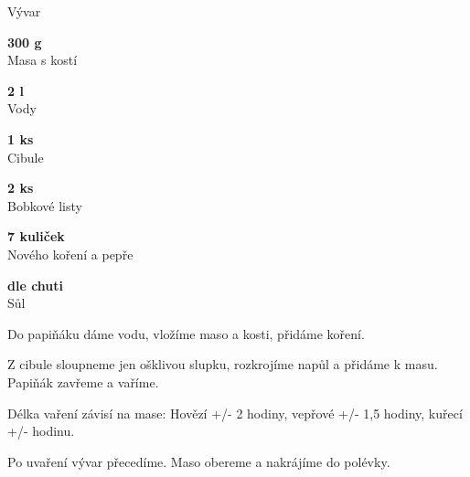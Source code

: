 \documentclass[11pt,a4paper]{article}
\begin{document}
\begin{recipe}[RawSienna]{Vývar}
    \begin{ingredients}
        \item \parbox[t]{\linewidth}{\raggedright \weight \textbf{300 g}\\ Masa s kostí}
        \item \parbox[t]{\linewidth}{\raggedright \liquid \textbf{2 l}\\ Vody}
        \item \parbox[t]{\linewidth}{\raggedright \piece \textbf{1 ks}\\ Cibule}
        \item \parbox[t]{\linewidth}{\raggedright \piece \textbf{2 ks}\\ Bobkové listy}
        \item \parbox[t]{\linewidth}{\raggedright \piece \textbf{7 kuliček}\\ Nového koření a pepře}
        \item \parbox[t]{\linewidth}{\raggedright \indefinite \textbf{dle chuti}\\ Sůl}
    \end{ingredients}
    \begin{steps}
        \item Do papiňáku dáme vodu, vložíme maso a kosti, přidáme koření. 
        \item Z cibule sloupneme jen ošklivou slupku, rozkrojíme napůl a přidáme k masu. Papiňák zavřeme a vaříme. 
        \item Délka vaření závisí na mase: Hovězí +/- 2 hodiny, vepřové +/- 1,5 hodiny, kuřecí +/- hodinu. 
        \item Po uvaření vývar přecedíme. Maso obereme a nakrájíme do polévky.
    \end{steps}
\end{recipe}
\end{document}
